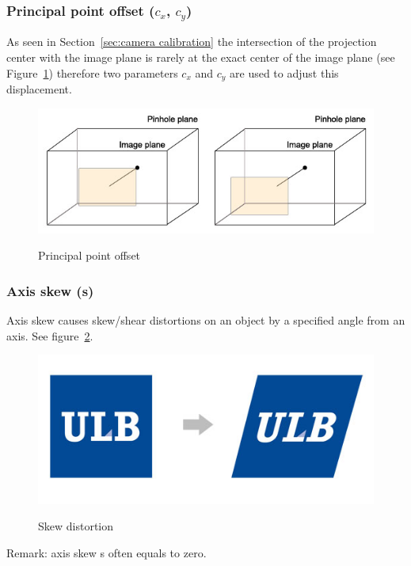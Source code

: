 \subsubsection{Principal point offset ($c_x$, $c_y$)}
As seen in Section~\ref{sec:camera calibration} the intersection of the projection center with the image plane is rarely at the exact center of the image plane (see Figure~\ref{fig:principalpoint}) therefore two parameters $c_x$ and $c_y$ are used to adjust this displacement.

\begin{figure}
\caption{Principal point offset}
\centering
    \includegraphics[width=1.0\textwidth]{images/principalpoint.jpg}
\label{fig:principalpoint}
\end{figure}


\subsubsection{Axis skew (s)}
Axis skew causes skew/shear distortions on an object by a specified angle from an axis. See figure~\ref{fig:ulbskew}.


\begin{figure}
\caption{Skew distortion}
\centering
    \includegraphics[width=1.0\textwidth]{images/ulbskew.jpg}
\label{fig:ulbskew}
\end{figure}

Remark: axis skew s often equals to zero.

